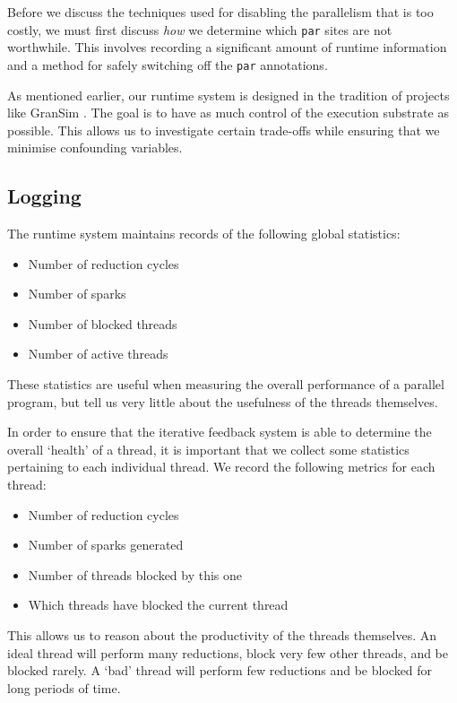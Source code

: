 Before we discuss the techniques used for disabling the parallelism that is too
costly, we must first discuss \emph{how} we determine which \verb|par| sites
are not worthwhile.  This involves recording a significant amount of runtime
information and a method for safely switching off the \verb-par- annotations.

As mentioned earlier, our runtime system is designed in the tradition of
projects like GranSim \citep{gransim}. The goal is to have as much control of
the execution substrate as possible. This allows us to investigate certain
trade-offs while ensuring that we minimise confounding variables.

\subsection*{Logging}

The runtime system maintains records of the following global statistics:

    \begin{itemize}
        \item Number of reduction cycles
        \item Number of sparks
        \item Number of blocked threads
        \item Number of active threads
    \end{itemize}

These statistics are useful when measuring the overall performance of a
parallel program, but tell us very little about the usefulness of the threads
themselves.

In order to ensure that the iterative feedback system is able to determine the
overall `health' of a thread, it is important that we collect some statistics
pertaining to each individual thread. We record the following metrics for each
thread:

    \begin{itemize}
        \item Number of reduction cycles
        \item Number of sparks generated
        \item Number of threads blocked by this one
        \item Which threads have blocked the current thread
    \end{itemize}

This allows us to reason about the productivity of the threads themselves.  An
ideal thread will perform many reductions, block very few other threads, and be
blocked rarely. A `bad' thread will perform few reductions and be blocked for
long periods of time.

